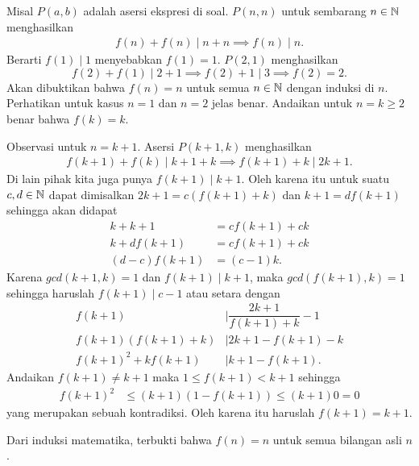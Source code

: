 
\begin{solusi}
    Misal $P(a,b)$ adalah asersi ekspresi di soal. $P(n,n)$ untuk sembarang $n \in \mathbb N$ menghasilkan
    \begin{align*}
        f(n)+f(n) \mid n+n \implies f(n) \mid n.
    \end{align*}
    Berarti $f(1) \mid 1$ menyebabkan $f(1)=1$. $P(2,1)$ menghasilkan  
    $$f(2)+f(1) \mid 2+1 \implies f(2)+1 \mid 3 \implies f(2)=2.$$ Akan dibuktikan bahwa $f(n)=n$ untuk semua $n \in \mathbb N$ dengan induksi di $n$.
    Perhatikan untuk kasus $n=1$ dan $n=2$ jelas benar. Andaikan untuk $n=k\ge 2$ benar bahwa $f(k)=k$. 
    
    Observasi untuk $n=k+1$. Asersi $P(k+1,k)$ menghasilkan
    \begin{align*}
        f(k+1)+f(k) \mid k+1 + k \implies f(k+1)+k \mid 2k+1.
    \end{align*}
    Di lain pihak kita juga punya $f(k+1) \mid k+1$. Oleh karena itu untuk suatu $c,d \in \mathbb N$ dapat dimisalkan $2k+1 = c(f(k+1)+k)$ dan $ k+1 = df(k+1) $
    sehingga akan didapat
    \begin{align*}
        k + k+1 &= cf(k+1)+ck\\
        k + df(k+1) &= cf(k+1) + ck\\
        (d-c)f(k+1) &= (c-1)k.
    \end{align*}
    Karena $gcd(k+1,k) =1$ dan $f(k+1) \mid k+1$, maka $gcd(f(k+1),k)=1$ sehingga haruslah $f(k+1) \mid c-1$ atau setara dengan
    \begin{align*}
        f(k+1) &\mid \dfrac{2k+1}{f(k+1)+k} - 1\\
        f(k+1)(f(k+1)+k) &\mid 2k+1 - f(k+1) - k\\
        f(k+1)^2+kf(k+1) &\mid k+1 - f(k+1).
    \end{align*}
    Andaikan $f(k+1) \neq k+1$ maka $1 \le f(k+1) < k+1$ sehingga
    \begin{align*}
        f(k+1)^2 &\le (k+1)(1-f(k+1)) \le (k+1)0 = 0
    \end{align*}
    yang merupakan sebuah kontradiksi. Oleh karena itu haruslah $f(k+1)=k+1$.

    Dari induksi matematika, terbukti bahwa $f(n)=n$ untuk semua bilangan asli $n$.
\end{solusi}

